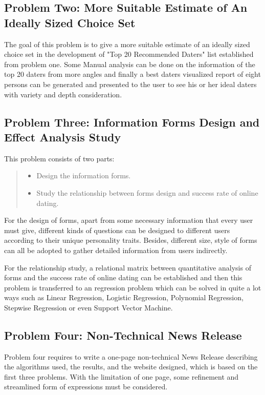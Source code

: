 \subsection{Problem Two:  More Suitable Estimate of An Ideally Sized Choice Set}                 
The goal of this problem is to give a more suitable estimate of an ideally sized choice set in the development of "Top 20 Recommended Daters" list established from problem one. Some Manual analysis can be done on the information of the top 20 daters from more angles and finally a best daters visualized report of eight persons can be generated and presented to the user to see his or her ideal daters with variety and depth consideration. 


\subsection{Problem Three: Information Forms Design and Effect Analysis Study}
This problem consists of two parts:
\begin{quote}
\begin{itemize}
	\item Design the information forms.
	\item Study the relationship between forms design and success rate of online dating. 
\end{itemize}
\end{quote}
\par
For the design of forms, apart from some necessary information that every user must give, different kinds of questions can be designed to different users according to their unique personality traits. Besides, different size, style of forms can all be adopted to gather detailed information from users indirectly.\par
For the relationship study, a relational matrix between quantitative analysis of forms and the success rate of online dating can be established and then this problem is transferred to an regression problem which can be solved in quite a lot ways such as Linear Regression, Logistic Regression, Polynomial Regression, Stepwise Regression or even Support Vector Machine.

\subsection{Problem Four:  Non-Technical News Release }
 Problem four requires to write a one-page non-technical News Release describing the algorithms used, the results, and the website designed, which is based on the first three problems. With the limitation of one page, some refinement and streamlined form of expressions must be considered.  

